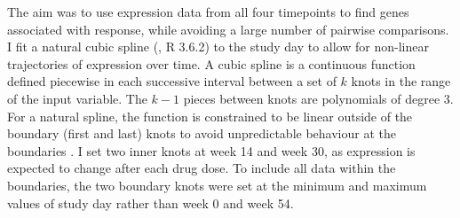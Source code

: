 
The aim was to use expression data from all four timepoints to find genes associated with response,
while avoiding a large number of pairwise comparisons.
I fit a natural cubic spline (, R 3.6.2) to the study day to allow for non-linear trajectories of expression over time.
A cubic spline is a continuous function defined piecewise in each successive interval between a set of $k$ knots in the range of the input variable.
The $k-1$ pieces between knots are polynomials of degree 3. 
For a natural spline, the function is constrained to be linear outside of the boundary (first and last) knots to avoid unpredictable behaviour at the boundaries \autocite{perperoglou2019ReviewSplineFunction}.
%
%
I set two inner knots at week 14 and week 30, as expression is expected to change after each drug dose.
To include all data within the boundaries, the two boundary knots were set at the minimum and maximum values of study day rather than week 0 and week 54.
